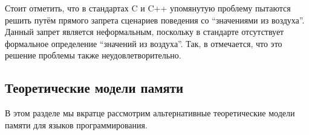 

Стоит отметить, что в стандартах C \cite{C:11} и C++ \cite{CPP:11, CPP:14} упомянутую проблему пытаются решить
путём прямого запрета сценариев поведения со ``значениями из воздуха''.
Данный запрет является неформальным, поскольку в стандарте отсутствует формальное определение
``значений из воздуха''.
Так, в \cite{Boehm-Demsky:MSPC14} отмечается, что это решение проблемы также неудовлетворительно.


\subsection{Теоретические модели памяти}
В этом разделе мы вкратце рассмотрим альтернативные теоретические модели памяти для языков программирования.

